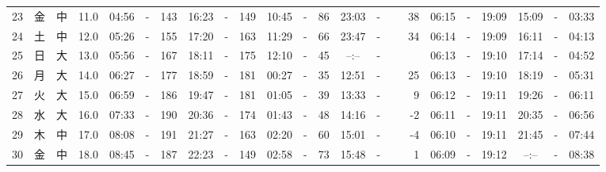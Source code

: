 \documentclass[12pt,a4j]{jsarticle}
\begin{document}
\begin{table}[htbp]
\begin{center}
{\begin{tabular}{|rc|cr|ccrccr|ccrccr|ccc|ccc|}
23 & 金 & 中 & 11.0 &  04:56 &-& 143 &  16:23 &-& 149 &  10:45 &-&  86 &  23:03 &-&  38 & 06:15 & -& 19:09 & 15:09 & -& 03:33 \\
24 & 土 & 中 & 12.0 &  05:26 &-& 155 &  17:20 &-& 163 &  11:29 &-&  66 &  23:47 &-&  34 & 06:14 & -& 19:09 & 16:11 & -& 04:13 \\
25 & 日 & 大 & 13.0 &  05:56 &-& 167 &  18:11 &-& 175 &  12:10 &-&  45 &  --:-- &-&~~~~~ & 06:13 & -& 19:10 & 17:14 & -& 04:52 \\
26 & 月 & 大 & 14.0 &  06:27 &-& 177 &  18:59 &-& 181 &  00:27 &-&  35 &  12:51 &-&  25 & 06:13 & -& 19:10 & 18:19 & -& 05:31 \\
27 & 火 & 大 & 15.0 &  06:59 &-& 186 &  19:47 &-& 181 &  01:05 &-&  39 &  13:33 &-&   9 & 06:12 & -& 19:11 & 19:26 & -& 06:11 \\
28 & 水 & 大 & 16.0 &  07:33 &-& 190 &  20:36 &-& 174 &  01:43 &-&  48 &  14:16 &-&  -2 & 06:11 & -& 19:11 & 20:35 & -& 06:56 \\
29 & 木 & 中 & 17.0 &  08:08 &-& 191 &  21:27 &-& 163 &  02:20 &-&  60 &  15:01 &-&  -4 & 06:10 & -& 19:11 & 21:45 & -& 07:44 \\
30 & 金 & 中 & 18.0 &  08:45 &-& 187 &  22:23 &-& 149 &  02:58 &-&  73 &  15:48 &-&   1 & 06:09 & -& 19:12 & --:-- & -& 08:38 \\
   \hline
   \end{tabular}}
   \end{center}
\end{table}
\newpage
\end{document}
